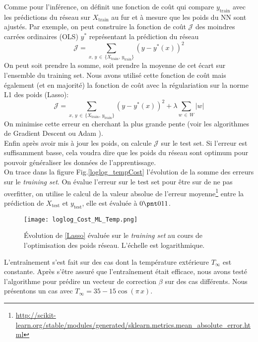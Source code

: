 \documentclass[a4paper,12pt]{article}
\newcommand{\bepar}[1]{
	\left( #1 \right)  
}
\newcommand{\J}{\mathcal{J}}
\newcommand{\tinf}{$T_\infty$}
\numberwithin{equation}{section} %
\begin{document}
\noindent Comme pour l'inférence, on définit une fonction de coût qui compare $y_{\text{train}}$ avec les prédictions du réseau sur $X_{\text{train}}$ au fur et à mesure que les poids du NN sont ajustés. Par exemple, on peut construire la fonction de coût $\J$ des moindres carrées ordinaires (OLS) $y^*$ représentant la prédiction du réseau 
\begin{equation}
\J = \sum_{x, \, y\, \in\, \{X_{\text{train}},\, y_{\text{train}}\}} \bepar{y - y^*\bepar{x}}^2 \tag{OLS} \label{JOLS}
\end{equation}
On peut soit prendre la somme, soit prendre la moyenne de cet écart sur l'ensemble du training set. Nous avons utilisé cette fonction de coût mais également (et en majorité) la fonction de coût avec la régulariation sur la norme L1 des poids (Lasso):
\begin{equation}
\J = \sum_{x, \, y\, \in\, \{X_{\text{train}},\, y_{\text{train}}\}} \bepar{y - y^*\bepar{x}}^2 + \lambda \sum_{w\, \in\, W} |w| \tag{Lasso} \label{Lasso}
\end{equation}
On minimise cette erreur en cherchant la plus grande pente (voir les algorithmes de Gradient Descent \citep{Goodfellow-et-al-2016} ou Adam \citep{kingma2014adam}).\\
Enfin après avoir mis à jour les poids, on calcule $\J$ sur le test set. Si l'erreur est suffisamment basse, cela voudra dire que les poids du réseau sont optimum pour pouvoir généraliser les données de l'apprentissage.\\

\noindent On trace dans la figure Fig.\eqref{loglog_tempCost} l'évolution de la somme des erreurs sur le \textit{training set}. On évalue l'erreur sur le test set pour être sur de ne pas overfitter, on utilise le calcul de la valeur absolue de l'erreur moyenne\footnote{\url{http://scikit-learn.org/stable/modules/generated/sklearn.metrics.mean_absolute_error.html}} entre la prédiction de $X_{\text{test}}$ et $y_{\text{test}}$, elle est évaluée à $0 \pnt 011$.

\begin{figure}[!ht]
\centering
\texttt{[image: loglog\_Cost\_ML\_Temp.png]}
\caption{\small{Évolution de \eqref{Lasso} évaluée sur le \textit{training set} au cours de l'optimisation des poids réseau. L'échelle est logarithmique.}}
\label{loglog_tempCost} \vspace{-3mm}
\end{figure}
\noindent L'entraînement s'est fait sur des cas dont la température extérieure \tinf $ $ est constante. Après s'être assuré que l'entraînement était efficace, nous avons testé l'algorithme pour prédire un vecteur de correction $\beta$ sur des cas différents. Nous présentons un cas avec $T_\infty =  35 - 15 \cos(\pi\,x)$.\\
\end{document}
